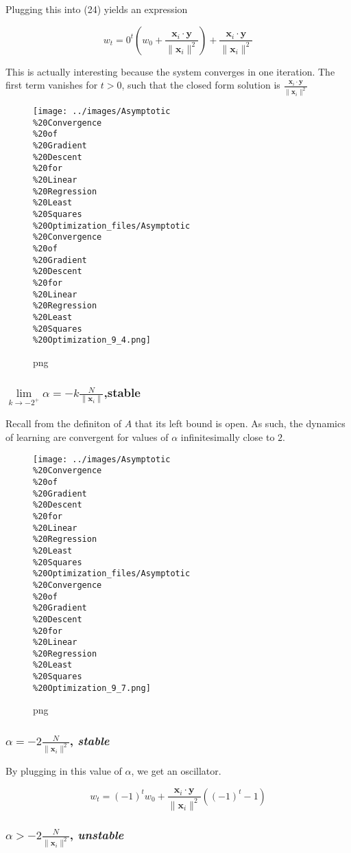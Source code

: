 \documentclass[]{article}
\begin{document}
Plugging this into (24) yields an expression

\[
w_t = 0^t\left(w_0 + \frac{\mathbf{x}_i\cdot\mathbf{y}}{\|\mathbf{x}_i\|^2}\right)+\frac{\mathbf{x}_i\cdot\mathbf{y}}{\|\mathbf{x}_i\|^2}
\]

This is actually interesting because the system converges in one
iteration. The first term vanishes for \(t>0\), such that the closed
form solution is
\(\frac{\mathbf{x}_i\cdot\mathbf{y}}{\|\mathbf{x}_i\|^2}\)

\begin{figure}[htbp]
\centering
\texttt{[image: ../images/Asymptotic\\\%20Convergence\\\%20of\\\%20Gradient\\\%20Descent\\\%20for\\\%20Linear\\\%20Regression\\\%20Least\\\%20Squares\\\%20Optimization\_files/Asymptotic\\\%20Convergence\\\%20of\\\%20Gradient\\\%20Descent\\\%20for\\\%20Linear\\\%20Regression\\\%20Least\\\%20Squares\\\%20Optimization\_9\_4.png]}
\caption{png}
\end{figure}

\subsubsection{\(\lim\limits_{k \to -2^+} \alpha = -k\frac{N}{\|\mathbf{x}_i\|}\),\textbf{stable}}

Recall from the definiton of \(A\) that its left bound is open. As such,
the dynamics of learning are convergent for values of \(\alpha\)
infinitesimally close to \(2\).

\begin{figure}[htbp]
\centering
\texttt{[image: ../images/Asymptotic\\\%20Convergence\\\%20of\\\%20Gradient\\\%20Descent\\\%20for\\\%20Linear\\\%20Regression\\\%20Least\\\%20Squares\\\%20Optimization\_files/Asymptotic\\\%20Convergence\\\%20of\\\%20Gradient\\\%20Descent\\\%20for\\\%20Linear\\\%20Regression\\\%20Least\\\%20Squares\\\%20Optimization\_9\_7.png]}
\caption{png}
\end{figure}

\subsubsection{\(\alpha = -2\frac{N}{\|\mathbf{x}_i\|^2}\), \emph{stable}}

By plugging in this value of \(\alpha\), we get an oscillator.

\[
w_t =(-1)^t w_0 + \frac{\mathbf{x}_i \cdot \mathbf{y}}{\|\mathbf{x}_i\|^2}\left((-1)^t -1\right)
\]

\subsubsection{\(\alpha > -2\frac{N}{\|\mathbf{x}_i\|^2}\), \emph{unstable}}
\end{document}
